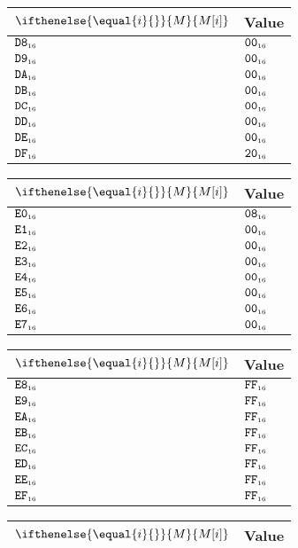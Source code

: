 \documentclass[a4paper,12pt]{article}
\newcommand{\num}[1]{\texttt{#1}}
\newcommand{\hex}[1]{\num{#1}_{\textup{\tiny 16}}}
\newcommand{\MEM}[1]{\ifthenelse{\equal{#1}{}}{M}{M[#1]}}
\begin{document}
\begin{center}
  \begin{tabular}{@{}ll@{}}
    \hline
    $\MEM{i}$  & Value \\
    \hline
    $\hex{D8}$ & $\hex{00}$ \\
    $\hex{D9}$ & $\hex{00}$ \\
    $\hex{DA}$ & $\hex{00}$ \\
    $\hex{DB}$ & $\hex{00}$ \\
    $\hex{DC}$ & $\hex{00}$ \\
    $\hex{DD}$ & $\hex{00}$ \\
    $\hex{DE}$ & $\hex{00}$ \\
    $\hex{DF}$ & $\hex{20}$ \\
    \hline
  \end{tabular}
  \hfil
  \begin{tabular}{@{}ll@{}}
    \hline
    $\MEM{i}$  & Value \\
    \hline
    $\hex{E0}$ & $\hex{08}$ \\
    $\hex{E1}$ & $\hex{00}$ \\
    $\hex{E2}$ & $\hex{00}$ \\
    $\hex{E3}$ & $\hex{00}$ \\
    $\hex{E4}$ & $\hex{00}$ \\
    $\hex{E5}$ & $\hex{00}$ \\
    $\hex{E6}$ & $\hex{00}$ \\
    $\hex{E7}$ & $\hex{00}$ \\
    \hline
  \end{tabular}
  \hfil
  \begin{tabular}{@{}ll@{}}
    \hline
    $\MEM{i}$  & Value \\
    \hline
    $\hex{E8}$ & $\hex{FF}$ \\
    $\hex{E9}$ & $\hex{FF}$ \\
    $\hex{EA}$ & $\hex{FF}$ \\
    $\hex{EB}$ & $\hex{FF}$ \\
    $\hex{EC}$ & $\hex{FF}$ \\
    $\hex{ED}$ & $\hex{FF}$ \\
    $\hex{EE}$ & $\hex{FF}$ \\
    $\hex{EF}$ & $\hex{FF}$ \\
    \hline
  \end{tabular}
  \hfil
  \begin{tabular}{@{}ll@{}}
    \hline
    $\MEM{i}$  & Value \\
    \hline

\end{tabular}
\end{center}
\end{document}
